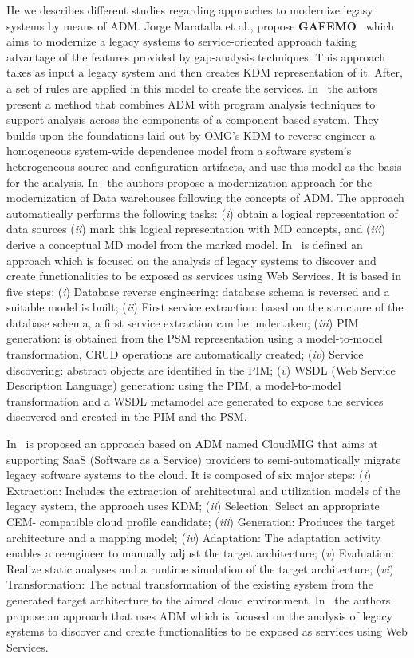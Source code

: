 He we describes different studies regarding approaches to modernize legasy systems by means of ADM. Jorge Maratalla et al., propose \textbf{GAFEMO}~\cite{6311013} which aims to modernize a legacy systems to service-oriented approach taking advantage of the features provided by gap-analysis techniques. This approach takes as input a legacy system and then creates KDM representation of it. After, a set of rules are applied in this model to create the services. In~\cite{6080786} the autors present a method that combines ADM with program analysis techniques to support analysis across the components of a component-based system. They builds upon the foundations laid out by OMG's KDM to reverse engineer a homogeneous system-wide dependence model from a software system's heterogeneous source and configuration artifacts, and use this model as the basis for the analysis. In~\cite{Mazon:2007:MDM:1784489.1784497} the authors propose a modernization approach for the modernization of Data warehouses following the concepts of ADM. The approach automatically performs the following tasks: (\textit{i}) obtain a logical representation of data sources (\textit{ii}) mark this logical representation with MD concepts, and (\textit{iii}) derive a conceptual MD model from the marked model. In~\cite{Guzman:2007:AAR:1339262.1339532} is defined an approach which is focused on the analysis of legacy systems to discover and create functionalities to be exposed as services using Web Services. It is based in five steps: (\textit{i}) Database reverse engineering: database schema is reversed and a suitable model is built; (\textit{ii}) First service extraction: based on the structure of the database schema, a first service extraction can be undertaken; (\textit{iii}) PIM generation: is obtained from the PSM representation using a model-to-model transformation, CRUD operations are automatically created; (\textit{iv}) Service discovering: abstract objects are identified in the PIM; (\textit{v}) WSDL (Web Service Description Language) generation: using the PIM, a model-to-model transformation and a WSDL  metamodel are generated to expose the services discovered and created in the PIM and the PSM. 

In~\cite{5741334, SMR:SMR582} is proposed an approach based on ADM named CloudMIG that aims at supporting SaaS (Software as a Service) providers to semi-automatically migrate legacy software systems to the cloud. It is composed of six major steps: (\textit{i}) Extraction: Includes the extraction of architectural and utilization models of the legacy system, the approach uses KDM; (\textit{ii}) Selection: Select an appropriate CEM- compatible cloud profile candidate; (\textit{iii}) Generation: Produces the target architecture and a mapping model; (\textit{iv}) Adaptation: The adaptation activity enables a reengineer to manually adjust the target architecture; (\textit{v}) Evaluation: Realize static analyses and a runtime simulation of the target architecture; (\textit{vi}) Transformation: The actual transformation of the existing system from the generated target architecture to the aimed cloud environment. In~\cite{4400179} the authors propose an approach that uses ADM which is focused on the analysis of legacy systems to discover and create functionalities to be exposed as services using Web Services.


